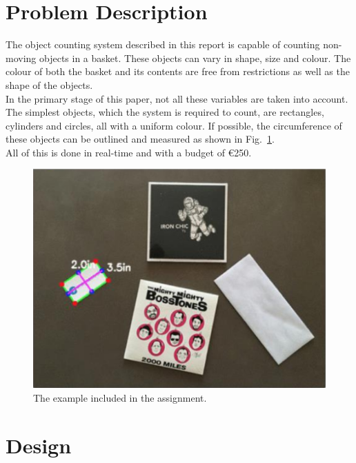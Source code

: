 \documentclass[11pt]{article}
\begin{document}
\section{Problem Description}

The object counting system described in this report is capable of counting non-moving objects in a basket. These objects can vary in shape, size and colour. The colour of both the basket and its contents are free from restrictions as well as the shape of the objects.\\
In the primary stage of this paper, not all these variables are taken into account. The simplest objects, which the system is required to count, are rectangles, cylinders and circles, all with a uniform colour. If possible, the circumference of these objects can be outlined and measured as shown in Fig.~\ref{fig:example}.\\ All of this is done in real-time and with a budget of \euro 250.

\begin{figure}[h]
\centering
  \includegraphics[width=0.7\linewidth]{opdracht.png}
  \caption{The example included in the assignment.}
  \label{fig:example}
\end{figure}



\section{Design}
\end{document}
